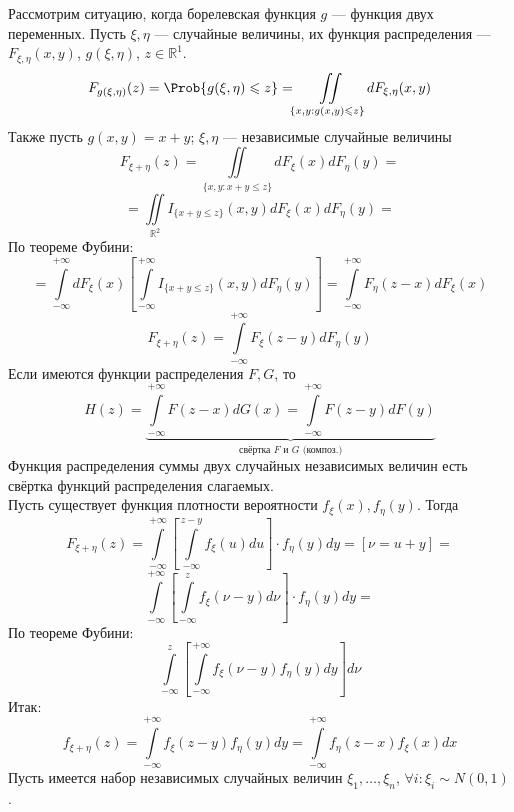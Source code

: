 Рассмотрим ситуацию, когда борелевская функция $g$ --- функция двух переменных. Пусть $\xi, \eta$ --- случайные величины, их функция распределения --- $F_{\xi, \eta} (x, y)$, $g(\xi, \eta)$, $z \in \mathbb{R}^1$.
	\[
		F_{g(\xi, \eta)} (z) = \Prob \{ g(\xi, \eta) \leqslant z \} = \iint\limits_{\{ x, y : g(x, y) \leqslant z \}} d F_{\xi, \eta} (x, y)
	\]
	Также пусть $g(x, y) = x + y$; $\xi, \eta$ --- независимые случайные величины
	\[
		F_{\xi + \eta} (z) = \iint\limits_{\{ x, y : x + y \leqslant z \}} dF_{\xi} (x) dF_{\eta} (y) =
	\]
	\[
		= \iint\limits_{\mathbb{R}^2} I_{\{ x + y \leqslant z \}} (x, y) dF_{\xi} (x) dF_{\eta} (y) =
	\]
	По теореме Фубини:
	\[
		= \int\limits_{-\infty}^{+\infty} dF_{\xi} (x) \left[ \int\limits_{-\infty}^{+\infty} I_{\{ x + y \leqslant z \}} (x, y) dF_{\eta} (y) \right] = \int\limits_{-\infty}^{+\infty} F_{\eta} (z-x) dF_{\xi} (x)
	\]
	\[
		F_{\xi + \eta} (z) = \int\limits_{-\infty}^{+\infty} F_{\xi} (z - y) dF_{\eta} (y)
	\]
	Если имеются функции распределения $F, G$, то
	\[
		H (z) = \underbrace{\int\limits_{-\infty}^{+\infty} F(z-x) dG(x) = \int\limits_{-\infty}^{+\infty} F(z - y) dF(y)}_{\text{свёртка $F$ и $G$ (композ.)}}
	\]
	Функция распределения суммы двух случайных независимых величин есть свёртка функций распределения слагаемых. \\
Пусть существует функция плотности вероятности $f_{\xi} (x), f_{\eta} (y)$. Тогда
\[
	F_{\xi + \eta} (z) = \int\limits_{-\infty}^{+\infty} \left[ \int\limits_{-\infty}^{z-y} f_{\xi} (u) du \right] \cdot f_{\eta} (y) dy = [\nu = u + y] =
\]
\[
	\int\limits_{-\infty}^{+\infty} \left[ \int\limits_{-\infty}^{z} f_{\xi} (\nu - y)d\nu \right] \cdot f_{\eta} (y) dy =
\]
По теореме Фубини:
\[
	\int\limits_{-\infty}^{z} \left[ \int\limits_{-\infty}^{+\infty} f_{\xi} (\nu - y) f_{\eta} (y) dy \right] d\nu
\]
Итак:
\[
	f_{\xi + \eta} (z) = \int\limits_{-\infty}^{+\infty} f_{\xi} (z - y) f_{\eta} (y) dy = \int\limits_{-\infty}^{+\infty} f_{\eta} (z - x) f_{\xi} (x) dx
\]
Пусть имеется набор независимых случайных величин $\xi_1, \ldots, \xi_n$, $\forall i : \xi_i \sim N (0,1)$. \\

